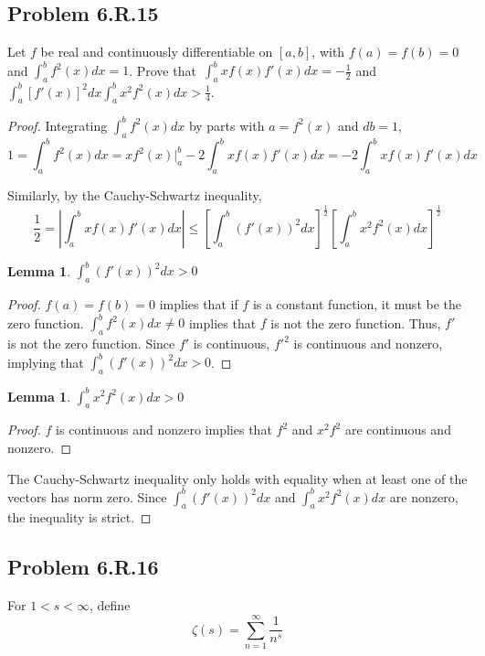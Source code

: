 \documentclass{amsart}
\newtheorem{lemma}[theorem]{Lemma}
\begin{document}
\subsection*{Problem 6.R.15}
Let $f$ be real and continuously differentiable on $[a, b]$, with $f(a) = f(b) = 0$ and $\int_a^b f^2(x)dx = 1$. Prove that\ $\int_a^b xf(x)f'(x)dx = -\frac{1}{2}$ and $\int_a^b[f'(x)]^2dx \int_a^b x^2f^2(x)dx > \frac{1}{4}$.

\begin{proof}
Integrating $\int_a^b f^2(x)dx$ by parts with $a = f^2(x)$ and $db = 1$,
\[
1 = \int_a^bf^2(x)dx = xf^2(x)\Big|_a^b - 2\int_a^bxf(x)f'(x)dx = - 2\int_a^bxf(x)f'(x)dx
\]

Similarly, by the Cauchy-Schwartz inequality,
\[
\frac{1}{2} = \left|\int_a^b xf(x)f'(x)dx \right|
\leq \left[ \int_a^b (f'(x))^2 dx\right]^\frac{1}{2} \left[ \int_a^b x^2f^2(x)dx \right]^\frac{1}{2}
\]

\begin{lemma}
$\int_a^b (f'(x))^2 dx > 0$
\end{lemma}

\begin{proof}
$f(a) = f(b) = 0$ implies that if $f$ is a constant function, it must be the zero function. $\int_a^b f^2(x)dx \neq 0$ implies that $f$ is not the zero function. Thus, $f'$ is not the zero function. Since $f'$ is continuous, ${f'}^2$ is continuous and nonzero, implying that $\int_a^b (f'(x))^2 dx > 0$.
\end{proof}

\begin{lemma}
$\int_a^b x^2 f^2(x) dx > 0$
\end{lemma}

\begin{proof}
$f$ is continuous and nonzero implies that $f^2$ and $x^2 f^2$ are continuous and nonzero.
\end{proof}

The Cauchy-Schwartz inequality only holds with equality when at least one of the vectors has norm zero. Since $\int_a^b (f'(x))^2 dx$ and $\int_a^b x^2 f^2(x) dx$ are nonzero, the inequality is strict.

\end{proof}

\subsection*{Problem 6.R.16}

For $1 < s < \infty$, define
\[
\zeta(s) = \sum_{n=1}^\infty \frac{1}{n^s}
\]
\end{document}
